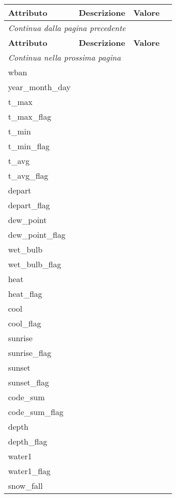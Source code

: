 \begin{longtable}{lccc}
	\toprule
	\textbf{Attributo} \quad & \textbf{Descrizione} & \textbf{Valore} \\
	\midrule
	\endfirsthead
	\multicolumn{4}{l}{\footnotesize\itshape Continua dalla pagina precedente} \\
	\toprule
	\textbf{Attributo} \quad & \textbf{Descrizione} & \textbf{Valore} \\
	\midrule			
	\endhead
	\multicolumn{4}{l}{\footnotesize\itshape Continua nella prossima pagina} \\
	\endfoot
	\endlastfoot
	wban				& 	 & 			 	\\	
	year\_month\_day	& 	 & 			  	\\	
	t\_max				& 	 & 		   	\\
	t\_max\_flag		& 	 & 			   	\\	
	t\_min				& 	 & 		   	\\
	t\_min\_flag		& 	 & 			   	\\	
	t\_avg				& 	 & 		   	\\
	t\_avg\_flag		& 	 & 			   	\\	
	depart				& 	 & 		   	\\
	depart\_flag		& 	 & 			   	\\	
	dew\_point			& 	 & 		   	\\
	dew\_point\_flag	& 	 & 			   	\\		
	wet\_bulb			& 	 & 		   	\\
	wet\_bulb\_flag		& 	 & 			   	\\	
	heat				& 	 & 		   	\\
	heat\_flag			& 	 & 			   	\\	
	cool				& 	 & 		   	\\
	cool\_flag			& 	 & 			   	\\	
	sunrise				& 	 & 		   	\\
	sunrise\_flag		& 	 & 			   	\\	
	sunset				& 	 & 		   	\\
	sunset\_flag		& 	 & 		   	\\	
	code\_sum			& 	 & 		   	\\
	code\_sum\_flag		& 	 & 		   	\\	
	depth				& 	 & 		 	\\
	depth\_flag			& 	 & 		  	\\	
	water1				& 	 & 				\\
	water1\_flag		& 	 & 		  	\\	
	snow\_fall			& 	 & 				\\	

\end{longtable}
